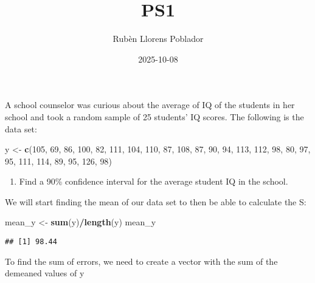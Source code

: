 \documentclass[
]{article}
\title{PS1}
\author{Rubèn Llorens Poblador}
\date{2025-10-08}
\newenvironment{Shaded}{\begin{snugshade}}{\end{snugshade}}
\newcommand{\DecValTok}[1]{\textcolor[rgb]{0.00,0.00,0.81}{#1}}
\newcommand{\FunctionTok}[1]{\textcolor[rgb]{0.13,0.29,0.53}{\textbf{#1}}}
\newcommand{\NormalTok}[1]{#1}
\newcommand{\OtherTok}[1]{\textcolor[rgb]{0.56,0.35,0.01}{#1}}
\newcommand{\SpecialCharTok}[1]{\textcolor[rgb]{0.81,0.36,0.00}{\textbf{#1}}}
\providecommand{\tightlist}{%
  \setlength{\itemsep}{0pt}\setlength{\parskip}{0pt}}
\begin{document}
\maketitle

A school counselor was curious about the average of IQ of the students
in her school and took a random sample of 25 students' IQ scores. The
following is the data set:

\begin{Shaded}
\begin{Highlighting}[]
\NormalTok{y }\OtherTok{\textless{}{-}} \FunctionTok{c}\NormalTok{(}\DecValTok{105}\NormalTok{, }\DecValTok{69}\NormalTok{, }\DecValTok{86}\NormalTok{, }\DecValTok{100}\NormalTok{, }\DecValTok{82}\NormalTok{, }\DecValTok{111}\NormalTok{, }\DecValTok{104}\NormalTok{, }\DecValTok{110}\NormalTok{, }\DecValTok{87}\NormalTok{, }\DecValTok{108}\NormalTok{, }\DecValTok{87}\NormalTok{, }\DecValTok{90}\NormalTok{, }\DecValTok{94}\NormalTok{, }\DecValTok{113}\NormalTok{, }\DecValTok{112}\NormalTok{, }\DecValTok{98}\NormalTok{, }\DecValTok{80}\NormalTok{, }\DecValTok{97}\NormalTok{, }\DecValTok{95}\NormalTok{,}
       \DecValTok{111}\NormalTok{, }\DecValTok{114}\NormalTok{, }\DecValTok{89}\NormalTok{, }\DecValTok{95}\NormalTok{, }\DecValTok{126}\NormalTok{, }\DecValTok{98}\NormalTok{)}
\end{Highlighting}
\end{Shaded}

\begin{enumerate}
\def\labelenumi{\arabic{enumi}.}
\tightlist
\item
  Find a 90\% confidence interval for the average student IQ in the
  school.
\end{enumerate}

We will start finding the mean of our data set to then be able to
calculate the S:

\begin{Shaded}
\begin{Highlighting}[]
\NormalTok{mean\_y }\OtherTok{\textless{}{-}} \FunctionTok{sum}\NormalTok{(y)}\SpecialCharTok{/}\FunctionTok{length}\NormalTok{(y)}
\NormalTok{mean\_y}
\end{Highlighting}
\end{Shaded}

\begin{verbatim}
## [1] 98.44
\end{verbatim}

To find the sum of errors, we need to create a vector with the sum of
the demeaned values of y
\end{document}
